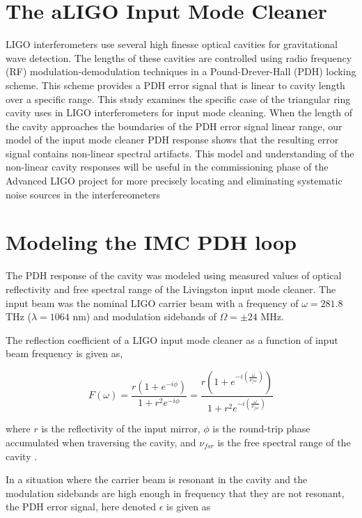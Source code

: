 \section{The aLIGO Input Mode Cleaner}

LIGO interferometers use several high finesse optical cavities for gravitational wave detection. The lengths of these cavities are controlled using radio frequency (RF) modulation-demodulation techniques in a Pound-Drever-Hall (PDH) locking scheme. This scheme provides a PDH error signal that is linear to cavity length over a specific range. This study examines the specific case of the triangular ring cavity uses in LIGO interferometers for input mode cleaning. When the length of the cavity approaches the boundaries of the PDH error signal linear range, our model of the input mode cleaner PDH response shows that the resulting error signal contains non-linear spectral artifacts. This model and understanding of the non-linear cavity responses will be useful in the commissioning phase of the Advanced LIGO project for more precisely locating and eliminating systematic noise sources in the interfereometers

\section{Modeling the IMC PDH loop}

The PDH response of the cavity was modeled using measured values of optical reflectivity and free spectral range of the Livingston input mode cleaner. The input beam was the nominal LIGO carrier beam with a frequency of $\omega = 281.8$ THz ($\lambda = 1064$ nm) and modulation sidebands of $\Omega = \pm24$ MHz.

The reflection coefficient of a LIGO input mode cleaner as a function of input beam frequency is given as,

\begin{equation}
F(\omega) = \frac{r(1 + e^{-i\phi})}{1+r^2e^{-i\phi}} = \frac{r(1 + e^{-i(\frac{\omega}{\nu_{fsr}})})}{1+r^2e^{-i(\frac{\omega}{\nu_{fsr}})}}
\end{equation}

where $r$ is the reflectivity of the input mirror, $\phi$ is the round-trip phase accumulated when traversing the cavity, and $\nu_{fsr}$ is the free spectral range of the cavity \cite{Mueller}.

In a situation where the carrier beam is resonant in the cavity and the modulation sidebands are high enough in frequency that they are not resonant, the PDH error signal, here denoted $\epsilon$ is given as

